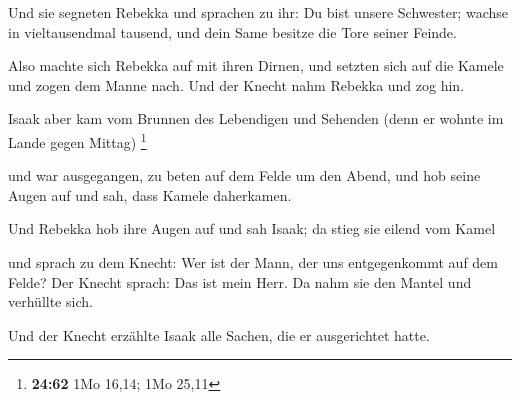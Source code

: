  Und sie segneten Rebekka und sprachen zu ihr: Du bist
unsere Schwester; wachse in vieltausendmal tausend, und dein Same
besitze die Tore seiner Feinde.

 Also machte sich Rebekka auf mit ihren Dirnen, und
setzten sich auf die Kamele und zogen dem Manne nach. Und der Knecht
nahm Rebekka und zog hin.

 Isaak aber kam vom Brunnen des Lebendigen und Sehenden
(denn er wohnte im Lande gegen Mittag) \footnote{\textbf{24:62} 1Mo
  16,14; 1Mo 25,11}

 und war ausgegangen, zu beten auf dem Felde um den
Abend, und hob seine Augen auf und sah, dass Kamele daherkamen.

 Und Rebekka hob ihre Augen auf und sah Isaak; da stieg
sie eilend vom Kamel

 und sprach zu dem Knecht: Wer ist der Mann, der uns
entgegenkommt auf dem Felde? Der Knecht sprach: Das ist mein Herr. Da
nahm sie den Mantel und verhüllte sich.

 Und der Knecht erzählte Isaak alle Sachen, die er
ausgerichtet hatte.

